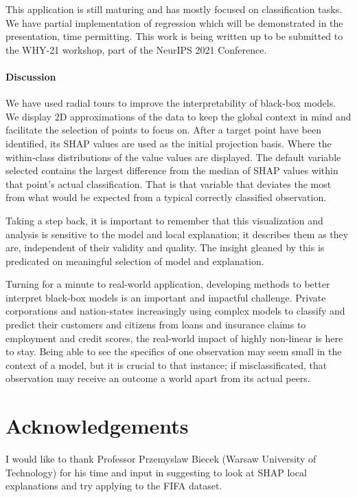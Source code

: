 \documentclass{template/monashthesis}
\begin{document}
This application is still maturing and has mostly focused on classification tasks. We have partial implementation of regression which will be demonstrated in the presentation, time permitting. This work is being written up to be submitted to the WHY-21 workshop, part of the NeurIPS 2021 Conference.

\hypertarget{discussion}{%
\subsubsection{Discussion}\label{discussion}}

We have used radial tours to improve the interpretability of black-box models. We display 2D approximations of the data to keep the global context in mind and facilitate the selection of points to focus on. After a target point have been identified, its SHAP values are used as the initial projection basis. Where the within-class distributions of the value values are displayed. The default variable selected contains the largest difference from the median of SHAP values within that point's actual classification. That is that variable that deviates the most from what would be expected from a typical correctly classified observation.

Taking a step back, it is important to remember that this visualization and analysis is sensitive to the model and local explanation; it describes them as they are, independent of their validity and quality. The insight gleaned by this is predicated on meaningful selection of model and explanation.

Turning for a minute to real-world application, developing methods to better interpret black-box models is an important and impactful challenge. Private corporations and nation-states increasingly using complex models to classify and predict their customers and citizens from loans and insurance claims to employment and credit scores, the real-world impact of highly non-linear is here to stay. Being able to see the specifics of one observation may seem small in the context of a model, but it is crucial to that instance; if misclassificated, that observation may receive an outcome a world apart from its actual peers.

\hypertarget{sec:acknowledgements}{%
\chapter{Acknowledgements}\label{sec:acknowledgements}}

I would like to thank Professor Przemyslaw Biecek (Warsaw University of Technology) for his time and input in suggesting to look at SHAP local explanations and try applying to the FIFA dataset.
\end{document}
